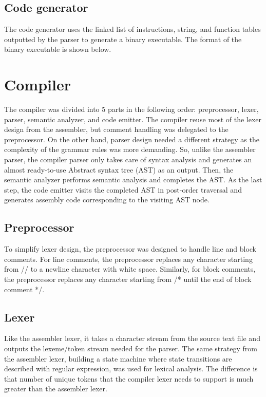 \documentclass[manuscript,screen,nonacm]{acmart}
\begin{document}
\subsection{Code generator}
The code generator uses the linked list of instructions, string, and function tables outputted by the parser to generate a binary executable. The format of the binary executable is shown below.


\section{Compiler}
The compiler was divided into 5 parts in the following order: preprocessor, lexer, parser, semantic analyzer, and code emitter. The compiler reuse most of the lexer design from the assembler, but comment handling was delegated to the preprocessor. On the other hand, parser design needed a different strategy as the complexity of the grammar rules was more demanding. So, unlike the assembler parser, the compiler parser only takes care of syntax analysis and generates an almost ready-to-use Abstract syntax tree (AST) as an output. Then, the semantic analyzer performs semantic analysis and completes the AST. As the last step, the code emitter visits the completed AST in post-order traversal and generates assembly code corresponding to the visiting AST node.

\subsection{Preprocessor}
To simplify lexer design, the preprocessor was designed to handle line and block comments. For line comments, the preprocessor replaces any character starting from // to a newline character with white space. Similarly, for block comments, the preprocessor replaces any character starting from /* until the end of block comment */.

\subsection{Lexer}
Like the assembler lexer, it takes a character stream from the source text file and outputs the lexeme/token stream needed for the parser. The same strategy from the assembler lexer, building a state machine where state transitions are described with regular expression, was used for lexical analysis. The difference is that number of unique tokens that the compiler lexer needs to support is much greater than the assembler lexer.
\end{document}
